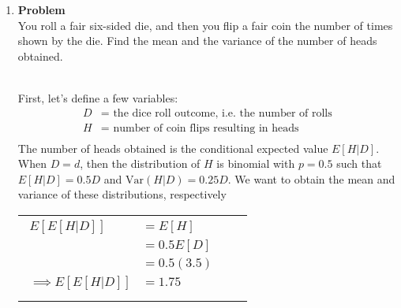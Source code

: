 \documentclass[12pt]{article}
\newenvironment{Ex}{\textbf{Problem}\vspace{.75em}\\}{}
\begin{document}
\begin{enumerate}
\begin{Ex}
\begin{solution}
\begin{equation}
\begin{aligned}
          &= \sum_{z} z \sum_{x,y} p_{X,Y,Z}(x,y,z) \\
          &= \sum_{z} z p_Z(z) \\
          \implies E[E[Z|X,Y]] &= E[Z] \\
        \end{aligned}
      \end{equation}
    \end{solution}
  \end{Ex}
\item
  \begin{Ex}
    You roll a fair six-sided die, and then you flip a fair coin the
    number of times shown by the die. Find the mean and the variance
    of the number of heads obtained.
    \begin{solution} \hfill \vspace{.75em} \\
      First, let's define a few variables:
      \begin{equation}
        \label{eq:3-decls}
        \begin{aligned}
          D &= \text{ the dice roll outcome, i.e. the number of rolls} \\
          H &= \text{ number of coin flips resulting in heads} \\
        \end{aligned}
      \end{equation}
      The number of heads obtained is the conditional expected value
      $E[H|D]$. When $D=d$, then the distribution of $H$ is binomial
      with $p=0.5$ such that $E[H|D]=0.5D$ and $\text{Var}(H|D) =
      0.25D$. We want to obtain the mean and variance of these
      distributions, respectively
      \\
      \begin{tabularx}{.95\textwidth}{XX}
        \begin{equation}
          \label{eq:3-e}
          \begin{aligned}
            E[E[H|D]] &= E[H] \\
            &= 0.5E[D] \\
            &= 0.5(3.5) \\
            \implies E[E[H|D]] &= 1.75 \\
          \end{aligned}
        \end{equation} &
        \begin{equation}
          \label{eq:3-var}
          \begin{aligned}

\end{aligned}
\end{equation}
\end{tabularx}
\end{solution}
\end{Ex}
\end{enumerate}
\end{document}
